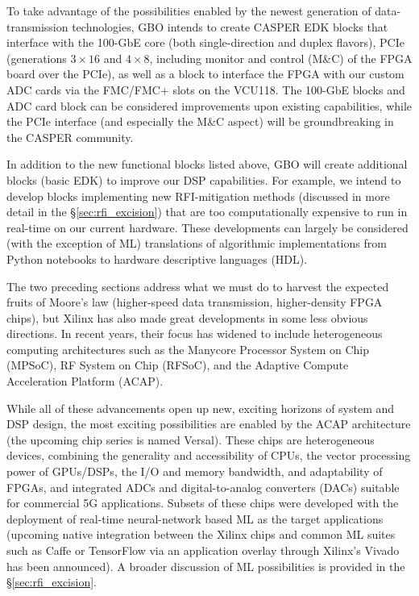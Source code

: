 \documentclass[10pt]{myNSF}
\begin{document}
 To take advantage of the
possibilities enabled by the newest generation of data-transmission
technologies, GBO intends to create CASPER EDK blocks that interface
with the 100-GbE core (both single-direction and duplex flavors), PCIe
(generations $3 \times 16$ and $4 \times 8$, including monitor and
control (M\&C) of the FPGA board over the PCIe), as well as a block to
interface the FPGA with our custom ADC cards via the FMC/FMC+ slots on
the VCU118. The 100-GbE blocks and ADC card block can be considered
improvements upon existing capabilities, while the PCIe interface (and
especially the M\&C aspect) will be groundbreaking in the CASPER
community.

 In addition to the new functional
blocks listed above, GBO will create additional blocks (basic EDK) to
improve our DSP capabilities. For example, we intend to develop blocks
implementing new RFI-mitigation methods (discussed in more detail in
the \S\ref{sec:rfi_excision}) that are too computationally expensive
to run in real-time on our current hardware. These developments can
largely be considered (with the exception of ML) translations of
algorithmic implementations from Python notebooks to hardware
descriptive languages (HDL).

 The two preceding sections
address what we must do to harvest the expected fruits of Moore's law
(higher-speed data transmission, higher-density FPGA chips), but
Xilinx has also made great developments in some less obvious
directions. In recent years, their focus has widened to include
heterogeneous computing architectures such as the Manycore Processor
System on Chip (MPSoC), RF System on Chip (RFSoC), and the Adaptive
Compute Acceleration Platform (ACAP).

While all of these advancements open up new, exciting horizons of
system and DSP design, the most exciting possibilities are enabled by
the ACAP architecture (the upcoming chip series is named
Versal). These chips are heterogeneous devices, combining the
generality and accessibility of CPUs, the vector processing power of
GPUs/DSPs, the I/O and memory bandwidth, and adaptability of FPGAs,
and integrated ADCs and digital-to-analog converters (DACs) suitable
for commercial 5G applications. Subsets of these chips were developed
with the deployment of real-time neural-network based ML as the target
applications (upcoming native integration between the Xilinx chips and
common ML suites such as Caffe or TensorFlow via an application
overlay through Xilinx’s Vivado has been announced). A broader
discussion of ML possibilities is provided in the
\S\ref{sec:rfi_excision}.
\end{document}
